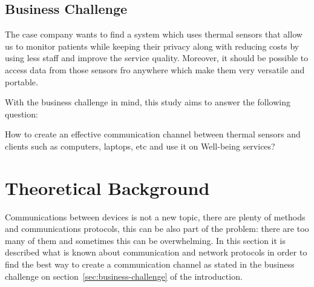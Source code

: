 \documentclass[hidelinks,11pt,a4paper,oneside,article]{memoir}
\begin{document}
\section*{Business Challenge}\label{sec:business-challenge}
The case company wants to find a system which uses thermal sensors that allow us to monitor patients while keeping their privacy along with reducing costs by using less staff and improve the service quality. Moreover, it should be possible to access data from those sensors fro anywhere which make them very versatile and portable.

With the business challenge in mind, this study aims to answer the following question:
\begin{displayquote}
{ How to create an effective communication channel between thermal sensors and clients such as computers, laptops, etc and use it on Well-being services?}
\end{displayquote}




\clearpage\chapter{Theoretical Background}\label{sec:theoretical-background}

Communications between devices is not a new topic, there are plenty of methods and communications protocols, this can be also part of the problem: there are too many of them and sometimes this can be overwhelming. In this section it is described what is known about communication and network protocols in order to find the best way to create a communication channel as stated in the business challenge on section~\ref{sec:business-challenge} of the introduction.
\end{document}
